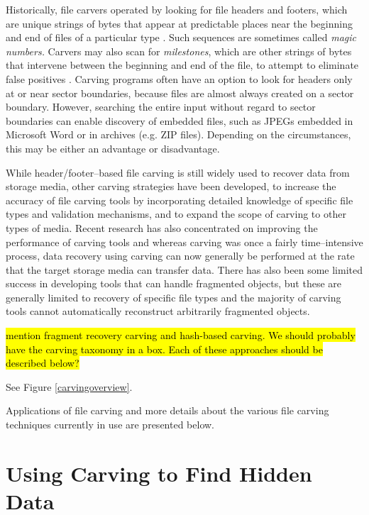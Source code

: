 Historically, file carvers operated by looking for file headers and
footers, which are unique strings of bytes that appear at predictable
places near the beginning and end of files of a particular type
\cite{Foremost, Scalpel}.  Such sequences are sometimes called
\emph{magic numbers.} Carvers may also scan for \emph{milestones}, which
are other strings of bytes that intervene between the beginning and
end of the file, to attempt to eliminate false positives 
\label{def:milestones}.  Carving programs often have an option to look for headers
only at or near sector boundaries, because files are almost always
created on a sector boundary.  However, searching the entire input
without regard to sector boundaries can enable discovery of embedded
files, such as JPEGs embedded in Microsoft Word or in archives
(e.g. ZIP files).  Depending on the circumstances, this may be either
an advantage or disadvantage.

While header/footer--based file carving is still widely used to
recover data from storage media, other carving strategies have been
developed, to increase the accuracy of file carving tools by
incorporating detailed knowledge of specific file types and validation
mechanisms, and to expand the scope of carving to other types of
media.  Recent research has also concentrated on improving the
performance of carving tools and whereas carving was once a fairly
time--intensive process, data recovery using carving can now generally
be performed at the rate that the target storage media can transfer
data.  There has also been some limited success in developing tools
that can handle fragmented objects, but these are generally limited to
recovery of specific file types and the majority of carving tools
cannot automatically reconstruct arbitrarily fragmented
objects. 


\hl{mention fragment recovery carving and hash-based carving. We should probably have the
  carving taxonomy in a box. Each of these approaches should be
  described below?}


See Figure \ref{carvingoverview}.  

Applications of file carving and more details about the various file carving techniques currently in use are presented below.

\section{Using Carving to Find Hidden Data}

